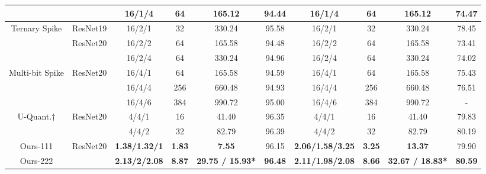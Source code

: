 \begin{table}[t]
\begin{adjustbox}{max width=0.9\textwidth}
\begin{threeparttable}
\begin{tabular}{cccccccccc}
                                 &                               & 16/1/4               & 64            & 165.12         & 94.44          & 16/1/4         & 64         & 165.12         & 74.47          \\ \midrule
\multirow{3}{*}{Ternary Spike \cite{guo2024ternary}}   & ResNet19                      & 16/2/1               & 32            & 330.24         & 95.58          & 16/2/1         & 32         & 330.24         & 78.45          \\ \cmidrule{2-10} 
                                 & \multirow{2}{*}{ResNet20}     & 16/2/2               & 64            & 165.58         & 94.48          & 16/2/2         & 64         & 165.58         & 73.41          \\
                                 &                               & 16/2/4               & 64            & 330.24         & 94.96          & 16/2/4         & 64         & 330.24         & 74.02          \\ \midrule
\multirow{3}{*}{Multi-bit Spike \cite{xiao2024multi}} & \multirow{3}{*}{ResNet20}     & 16/4/1               & 64            & 165.58         & 94.59          & 16/4/1         & 64         & 165.58         & 75.43          \\
                                 &                               & 16/4/4               & 256           & 660.48         & 94.93          & 16/4/4         & 256        & 660.48         & 76.51          \\
                                 &                               & 16/4/6               & 384           & 990.72         & 95.00          & 16/4/6         & 384        & 990.72         & -              \\ \midrule
\multirow{2}{*}{U-Quant.$\dagger$} & \multirow{2}{*}{ResNet20}     & 4/4/1                & 16            & 41.40          & 96.35          & 4/4/1          & 16         & 41.40          & 79.83          \\
                                 &                               & 4/4/2                & 32            & 82.79          & 96.39          & 4/4/2          & 32         & 82.79          & 80.19          \\ \midrule
Ours-111                         & \multirow{3}{*}{ResNet20}     & \textbf{1.38/1.32/1} & \textbf{1.83}  & \textbf{7.55}           & 96.15          & \textbf{2.06/1.58/3.25} & \textbf{3.25}  & \textbf{13.37}                   & 79.90          \\
Ours-222                         &                               & \textbf{2.13/2/2.08} & \textbf{8.87}  & \textbf{29.75 / 15.93*} & \textbf{96.48} & \textbf{2.11/1.98/2.08} & \textbf{8.66}  & \textbf{32.67 / 18.83*} & \textbf{80.59} \\

\end{tabular}
\end{threeparttable}
\end{adjustbox}
\end{table}
